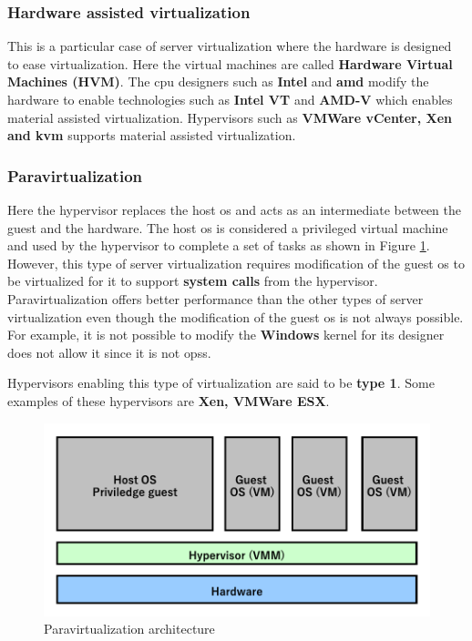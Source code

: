 \subsubsection{Hardware assisted virtualization}
This is a particular case of server virtualization where the hardware is designed to ease virtualization. Here the virtual machines are called \textbf{Hardware Virtual Machines (HVM)}. The \acrshort{cpu} designers such as \textbf{Intel} and \textbf{\acrshort{amd}} modify the hardware to enable technologies such as \textbf{Intel VT} and \textbf{AMD-V} which enables material assisted virtualization. Hypervisors such as \textbf{VMWare vCenter, Xen and \acrshort{kvm}} supports material assisted virtualization.

\subsubsection{Paravirtualization}
Here the hypervisor replaces the host \acrshort{os} and acts as an intermediate between the guest and the hardware. The host \acrshort{os} is considered a privileged virtual machine and used by the hypervisor to complete a set of tasks as shown in Figure \ref{fig:paravirtualization}. However, this type of server virtualization requires modification of the guest \acrshort{os} to be virtualized for it to support \textbf{system calls} from the hypervisor. Paravirtualization offers better performance than the other types of server virtualization even though the modification of the guest \acrshort{os} is not always possible. For example, it is not possible to modify the \textbf{Windows} kernel for its designer does not allow it since it is not \glspl{ops}. 
\par Hypervisors enabling this type of virtualization are said to be \textbf{type 1}. Some examples of these hypervisors are \textbf{Xen, VMWare ESX}.

\begin{figure}[!h]
    \centering
    \includegraphics[scale=0.65]{fig02/paravirtualization.pdf}
    \caption{Paravirtualization architecture}
    \label{fig:paravirtualization}
\end{figure}



